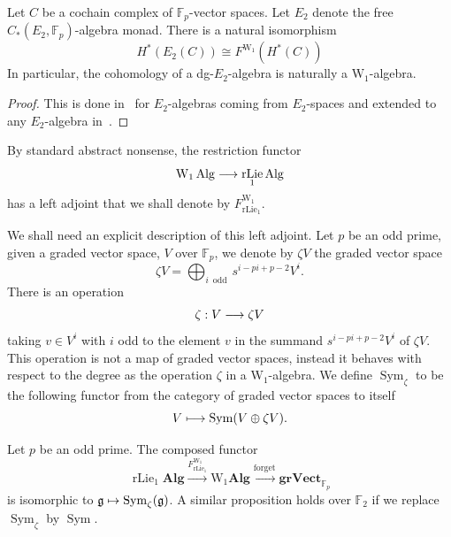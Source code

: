 \documentclass[AHL,Unicode,longabstracts,published]{cedram}
\renewcommand{\rm}[1]{{\mathrm{#1}}}
\DeclareMathOperator{\oDD}{odd}
\DeclareMathOperator{\Alg}{Alg}
\DeclareMathOperator{\sym}{Sym}
\DeclareMathOperator{\rlie}{rLie}
\newcommand{\alg}{\mathbf{Alg}}
\newcommand{\grVect}{\mathbf{grVect}}
\newcommand{\W}{\mathrm{W}}
\newcommand{\FF}{\mathbb{F}}
\newcommand{\fkg}{\mathfrak{g}}
\renewcommand*{\to}{\mathchoice{\longrightarrow}{\rightarrow}{\rightarrow}{\rightarrow}}
\let\oldmapsto\mapsto
\renewcommand*{\mapsto}{\mathchoice{\longmapsto}{\oldmapsto}{\oldmapsto}{\oldmapsto}}
\newcommand{\FF}{\mathbb{F}}
\begin{document}
\begin{theo}[Cohen]
Let $C$ be a cochain complex of $\FF_p$-vector spaces. Let $E_2$ denote the free $C_*(E_2,\FF_p)$-algebra monad. There is a natural isomorphism
\[
H^*(E_2(C))\cong F^{\W_1}(H^*(C))
\]
In particular, the cohomology of a dg-$E_2$-algebra is naturally a $\W_1$-algebra.
\end{theo}

\begin{proof}
This is done in~\cite[Theorem~III.3.1]{cohenladamay} for $E_2$-algebras coming from $E_2$-spaces and extended to any $E_2$-algebra in~\cite[Theorem~16.4]{galatiuscellular}.
\end{proof}

By standard abstract nonsense, the restriction functor
\[
\W_1\Alg\to \rlie_1\Alg
\]
has a left adjoint that we shall denote by $F_{\rlie_1}^{\W_1}$.

We shall need an explicit description of this left adjoint. Let $p$ be an odd prime, given a graded vector space, $V$ over $\FF_p$, we denote by $\zeta V$ the graded vector space
\[
\zeta V=\bigoplus_{i\  \oDD}s^{i-pi+p-2}V^i.
\]
There is an operation
\[
\zeta: V\to\zeta V
\]
taking $v\in V^i$ with $i$ odd to the element $v$ in the summand $s^{i-pi+p-2}V^i$ of $\zeta V$. This operation is not a map of graded vector spaces, instead it behaves with respect to the degree as the operation $\zeta$ in a $\W_1$-algebra. We define $\sym_{\zeta}$ to be the following functor from the category of graded vector spaces to itself
\[
V\mapsto \sym(V\oplus\zeta V).
\]


\begin{prop}\label{prop : free functor}
Let $p$ be an odd prime. The composed functor
\[
\rlie_1\alg\xrightarrow{F_{\rlie_1}^{\W_1}}\W_1\alg\xrightarrow{\rm{forget}}\grVect_{\FF_p}
\]
is isomorphic to $\fkg\mapsto\sym_{\zeta}(\fkg)$. A similar proposition holds over $\FF_2$ if we replace $\sym_{\zeta}$ by $\sym$.
\end{prop}
\end{document}
